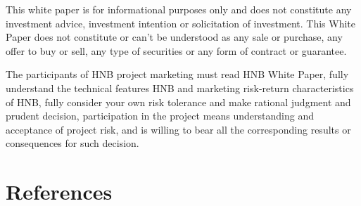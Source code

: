 \documentclass[fleqn,10pt]{SelfArx} %
\begin{document}
This white paper is for informational purposes only and does not constitute any investment advice, investment intention or solicitation of investment. This White Paper does not constitute or can't be understood as any sale or purchase, any offer to buy or sell, any type of securities or any form of contract or guarantee.

The participants of HNB project marketing must read HNB White Paper, fully understand the technical features HNB and marketing risk-return characteristics of HNB, fully consider your own risk tolerance and make rational judgment and prudent decision, participation in the project means understanding and acceptance of project risk, and is willing to bear all the corresponding results or consequences for such decision.




\section{References}





\end{document}
